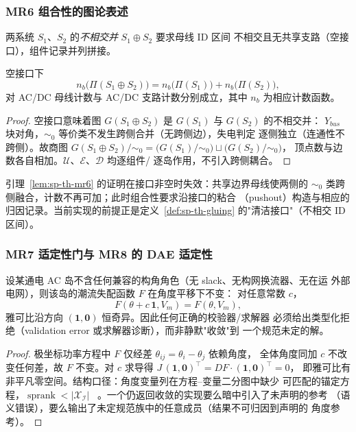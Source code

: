 \subsubsection{MR6 组合性的图论表述}
\begin{definition}\label{def:sp-th-gluing}
两系统 $S_1$、$S_2$ 的\emph{不相交并} $S_1\oplus S_2$ 要求母线 ID 区间
不相交且无共享支路（空接口），组件记录并列拼接。
\end{definition}

\begin{lemma}[投影对空接口粘合的分配律]\label{lem:sp-th-mr6}
空接口下
\begin{equation}
n_b\bigl(\Pi(S_1\oplus S_2)\bigr)=n_b\bigl(\Pi(S_1)\bigr)+n_b\bigl(\Pi(S_2)\bigr),
\end{equation}
对 AC/DC 母线计数与 AC/DC 支路计数分别成立，其中 $n_b$ 为相应计数函数。
\end{lemma}
\begin{proof}
空接口意味着图 $G(S_1\oplus S_2)$ 是 $G(S_1)$ 与 $G(S_2)$ 的不相交并：
$Y_{bus}$ 块对角，$\sim_0$ 等价类不发生跨侧合并（无跨侧边），失电判定
逐侧独立（连通性不跨侧）。故商图
$G(S_1\oplus S_2)/{\sim_0}
=\bigl(G(S_1)/{\sim_0}\bigr)\sqcup\bigl(G(S_2)/{\sim_0}\bigr)$，
顶点数与边数各自相加。$\mathcal U$、$\mathcal E$、$\mathcal D$ 均逐组件/
逐岛作用，不引入跨侧耦合。
\end{proof}

\begin{remark}[非空接口的边界]
引理~\ref{lem:sp-th-mr6} 的证明在接口非空时失效：共享边界母线使两侧的
$\sim_0$ 类跨侧融合，计数不再可加；此时组合性要求沿接口的粘合
（pushout）构造与相应的归因记录。当前实现的前提正是定义~\ref{def:sp-th-gluing}
的"清洁接口"（不相交 ID 区间）。
\end{remark}

\subsubsection{MR7 适定性门与 MR8 的 DAE 适定性}
\begin{proposition}[参考缺失导致结构欠定]\label{prop:sp-th-mr7}
设某通电 AC 岛不含任何兼容的构角角色（无 slack、无构网换流器、无在运
外部电网），则该岛的潮流失配函数 $F$ 在角度平移下不变：
对任意常数 $c$，
\begin{equation}
F(\theta+c\,\mathbf 1,V_m)=F(\theta,V_m),
\end{equation}
雅可比沿方向 $(\mathbf 1,\mathbf 0)$ 恒奇异。因此任何正确的校验器/求解器
必须给出类型化拒绝（validation error 或求解器诊断），而非静默"收敛"到
一个规范未定的解。
\end{proposition}
\begin{proof}
极坐标功率方程中 $F$ 仅经差 $\theta_{ij}=\theta_i-\theta_j$ 依赖角度，
全体角度同加 $c$ 不改变任何差，故 $F$ 不变。对 $c$ 求导得
$J\,(\mathbf 1,\mathbf 0)^{\!\top}=DF\cdot(\mathbf 1,\mathbf 0)^{\!\top}=0$，
即雅可比有非平凡零空间。结构口径：角度变量列在方程--变量二分图中缺少
可匹配的锚定方程，$\operatorname{sprank}<|\mathcal X_{\mathcal I}|$
~\cite{spth:murota87}。一个仍返回收敛的实现要么暗中引入了未声明的参考
（语义错误），要么输出了未定规范族中的任意成员（结果不可归因到声明的
角度参考）。
\end{proof}

